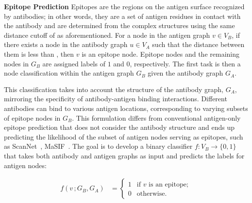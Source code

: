 \documentclass[11pt]{article}
\begin{document}
\textbf{Epitope Prediction} Epitopes are the regions on the antigen surface recognized by antibodies; in other words, they are a set of antigen residues in contact with the antibody and are determined from the complex structures using the same distance cutoff of  as aforementioned.
For a node in the antigen graph $ v \in V_B$, if there exists a node in the antibody graph $u \in V_A$ such that the distance between them is less than , then $v$ is an epitope node. Epitope nodes and the remaining nodes in $G_B$ are assigned labels of $1$ and $0$, respectively.
The first task is then a node classification within the antigen graph $G_B$ given the antibody graph $G_A$.

This classification takes into account the structure of the antibody graph, $G_A$, mirroring the specificity of antibody-antigen binding interactions.
Different antibodies can bind to various antigen locations, corresponding to varying subsets of epitope nodes in $G_B$.
This formulation differs from conventional antigen-only epitope prediction that does not consider the antibody structure and ends up predicting the likelihood of the subset of antigen nodes serving as epitopes, such as ScanNet~\citep{scannet}, MaSIF~\citep{masif}. The goal is to develop a binary classifier $f: V_B \to \{0, 1\}$ that takes both antibody and antigen graphs as input and predicts the labels for antigen nodes:

\begin{align}
  f(v \,;G_B, G_A) & = \begin{cases}
                         1 & \text{if } v \text{ is an epitope}; \\
                         0 & \text{otherwise}.
                       \end{cases}
  \label{eq:epitope_classification}
\end{align}
\end{document}
